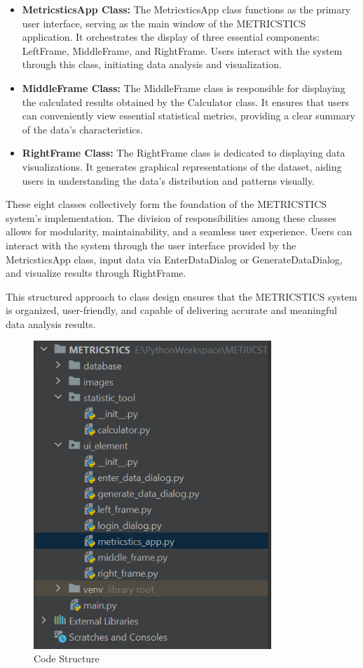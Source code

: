 \documentclass[english,12pt,a4paper]{report}
\begin{document}
\begin{itemize}[leftmargin=*]
			\item \textbf{MetricsticsApp Class:} The MetricsticsApp class functions as the primary user interface, serving as the main window of the METRICSTICS application. It orchestrates the display of three essential components: LeftFrame, MiddleFrame, and RightFrame. Users interact with the system through this class, initiating data analysis and visualization.
			
			\item \textbf{MiddleFrame Class:} The MiddleFrame class is responsible for displaying the calculated results obtained by the Calculator class. It ensures that users can conveniently view essential statistical metrics, providing a clear summary of the data's characteristics.
			
			\item \textbf{RightFrame Class:} The RightFrame class is dedicated to displaying data visualizations. It generates graphical representations of the dataset, aiding users in understanding the data's distribution and patterns visually.
		\end{itemize}
		These eight classes collectively form the foundation of the METRICSTICS system's implementation. The division of responsibilities among these classes allows for modularity, maintainability, and a seamless user experience. Users can interact with the system through the user interface provided by the MetricsticsApp class, input data via EnterDataDialog or GenerateDataDialog, and visualize results through RightFrame.
		
		This structured approach to class design ensures that the METRICSTICS system is organized, user-friendly, and capable of delivering accurate and meaningful data analysis results.
		
		\begin{figure}[h]
			\centering
			\includegraphics[width=0.8\textwidth]{images/code.jpg}
			\caption{Code Structure}
			\label{fig:Code Structure}
		\end{figure}
	
\end{document}
